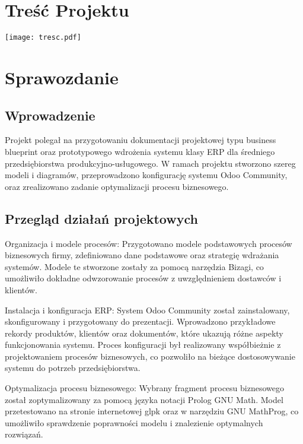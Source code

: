 \section{Treść Projektu}

\texttt{[image: tresc.pdf]}\\[0.5cm]

\section{Sprawozdanie}

\subsection{Wprowadzenie}

Projekt polegał na przygotowaniu dokumentacji projektowej typu business blueprint oraz prototypowego wdrożenia systemu klasy ERP dla średniego przedsiębiorstwa produkcyjno-usługowego. W ramach projektu stworzono szereg modeli i diagramów, przeprowadzono konfigurację systemu Odoo Community, oraz zrealizowano zadanie optymalizacji procesu biznesowego.

\subsection{Przegląd działań projektowych}

Organizacja i modele procesów:
Przygotowano modele podstawowych procesów biznesowych firmy, zdefiniowano dane podstawowe oraz strategię wdrażania systemów. Modele te stworzone zostały za pomocą narzędzia Bizagi\citep{bizagi}, co umożliwiło dokładne odwzorowanie procesów z uwzględnieniem dostawców i klientów.

Instalacja i konfiguracja ERP:
System Odoo Community\citep{odoo} został zainstalowany, skonfigurowany i przygotowany do prezentacji. Wprowadzono przykładowe rekordy produktów, klientów oraz dokumentów, które ukazują różne aspekty funkcjonowania systemu. Proces konfiguracji był realizowany współbieżnie z projektowaniem procesów biznesowych, co pozwoliło na bieżące dostosowywanie systemu do potrzeb przedsiębiorstwa.

Optymalizacja procesu biznesowego:
Wybrany fragment procesu biznesowego został zoptymalizowany za pomocą języka notacji Prolog GNU Math\cite{glpk}. Model przetestowano na stronie internetowej glpk 
oraz w narzędziu GNU MathProg, co umożliwiło sprawdzenie poprawności modelu i znalezienie optymalnych rozwiązań.

